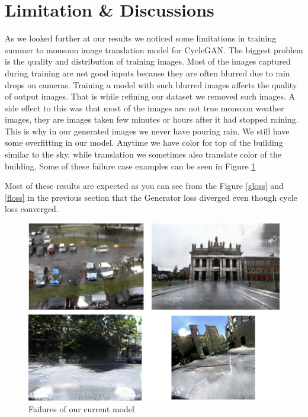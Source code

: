 \documentclass{article}
\begin{document}
\section{Limitation \& Discussions}
\label{limitationsanddiscussions}

As we looked further at our results we noticed some limitations in training summer to monsoon image translation model for CycleGAN. The biggest problem is the quality and distribution of training images. Most of the images captured during training are not good inputs because they are often blurred due to rain drops on cameras. Training a model with such blurred images affects the quality of output images. That is while refining our dataset we removed such images. A side effect to this was that most of the images are not true monsoon weather images, they are images taken few minutes or hours after it had stopped raining. This is why in our generated images we never have pouring rain. We still have some overfitting in our model. Anytime we have color for top of the building similar to the sky, while translation we sometimes also translate color of the building. Some of these failure case examples can be seen in Figure \ref{fig:failures}

Most of these results are expected as you can see from the Figure \ref{gloss} and \ref{floss} in the previous section that the Generator loss diverged even though cycle loss converged.

\begin{figure}[h!]
	\centering
	\includegraphics[scale=0.55]{images/failures}
	\caption{Failures of our current model}
	\label{fig:failures}
\end{figure}
\end{document}
